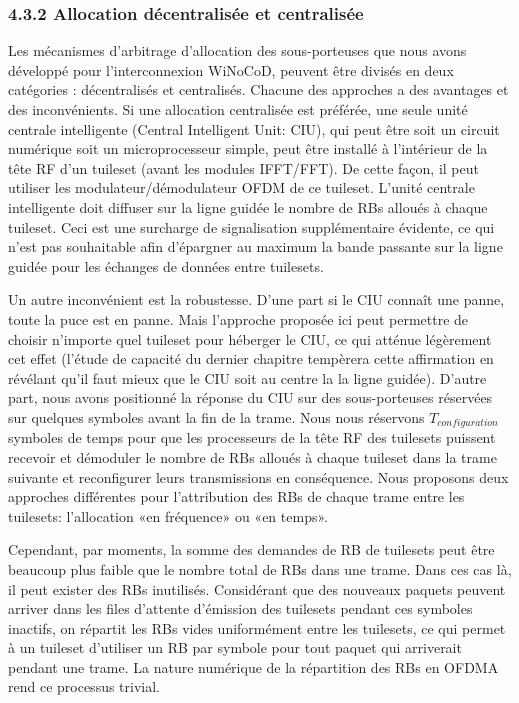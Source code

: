 \subsubsection*{4.3.2 Allocation décentralisée et centralisée}

Les mécanismes d'arbitrage d’allocation des sous-porteuses que nous avons développé pour l'interconnexion WiNoCoD, peuvent être divisés en deux catégories : décentralisés et centralisés. Chacune des approches a des avantages et des inconvénients. Si une allocation centralisée est préférée, une seule unité centrale intelligente (Central Intelligent Unit: CIU), qui peut être soit un circuit numérique soit un microprocesseur simple, peut être installé à l'intérieur de la tête RF d'un tuileset (avant les modules IFFT/FFT). De cette façon, il peut utiliser les modulateur/démodulateur OFDM de ce tuileset. L'unité centrale intelligente doit diffuser sur la ligne guidée le nombre de RBs alloués à chaque tuileset. Ceci est une surcharge de signalisation supplémentaire évidente, ce qui n'est pas souhaitable afin d’épargner au maximum la bande passante sur la ligne guidée pour les échanges de données entre tuilesets. 

Un autre inconvénient est la robustesse. D’une part si le CIU connaît une panne, toute la puce est en panne. Mais l’approche proposée ici peut permettre de choisir n’importe quel tuileset pour héberger le CIU, ce qui atténue légèrement cet effet (l’étude de capacité du dernier chapitre tempèrera cette affirmation en révélant qu’il faut mieux que le CIU soit au centre la la ligne guidée). D’autre part, nous avons positionné la réponse du CIU sur des sous-porteuses réservées sur quelques symboles avant la fin de la trame. Nous nous réservons $T_{configuration}$ symboles de temps pour que les processeurs de la tête RF des tuilesets puissent recevoir et démoduler le nombre de RBs alloués à chaque tuileset dans la trame suivante et reconfigurer leurs transmissions en conséquence. Nous proposons deux approches différentes pour l'attribution des RBs de chaque trame entre les tuilesets: l'allocation «en fréquence» ou «en temps».

Cependant, par moments, la somme des demandes de RB de tuilesets peut être beaucoup plus faible que le nombre total de RBs dans une trame. Dans ces cas là, il peut exister des RBs inutilisés. Considérant que des nouveaux paquets peuvent arriver dans les files d’attente d’émission des tuilesets pendant ces symboles inactifs, on répartit les RBs vides uniformément entre les tuilesets, ce qui permet à un tuileset d'utiliser un RB par symbole pour tout paquet qui arriverait pendant une trame. La nature numérique de la répartition des RBs en OFDMA rend ce processus trivial.

